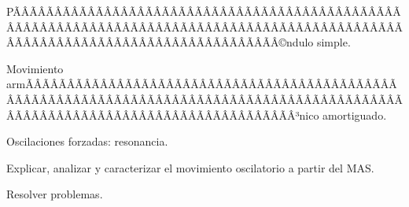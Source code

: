\begin{sumilla}
\begin{unit}
\begin{topicos}
	 \item  PÃÂÃÂÃÂÃÂÃÂÃÂÃÂÃÂÃÂÃÂÃÂÃÂÃÂÃÂÃÂÃÂÃÂÃÂÃÂÃÂÃÂÃÂÃÂÃÂÃÂÃÂÃÂÃÂÃÂÃÂÃÂÃÂÃÂÃÂÃÂÃÂÃÂÃÂÃÂÃÂÃÂÃÂÃÂÃÂÃÂÃÂÃÂÃÂÃÂÃÂÃÂÃÂÃÂÃÂÃÂÃÂÃÂÃÂÃÂÃÂÃÂÃÂÃÂÃÂ©ndulo simple.
         \item  Movimiento armÃÂÃÂÃÂÃÂÃÂÃÂÃÂÃÂÃÂÃÂÃÂÃÂÃÂÃÂÃÂÃÂÃÂÃÂÃÂÃÂÃÂÃÂÃÂÃÂÃÂÃÂÃÂÃÂÃÂÃÂÃÂÃÂÃÂÃÂÃÂÃÂÃÂÃÂÃÂÃÂÃÂÃÂÃÂÃÂÃÂÃÂÃÂÃÂÃÂÃÂÃÂÃÂÃÂÃÂÃÂÃÂÃÂÃÂÃÂÃÂÃÂÃÂÃÂÃÂ³nico amortiguado.
         \item  Oscilaciones forzadas: resonancia.
   \end{topicos}

   \begin{objetivos}
         \item  Explicar, analizar y caracterizar el movimiento oscilatorio a partir del MAS.
         \item  Resolver problemas.
   \end{objetivos}
\end{unit}


\end{sumilla}
